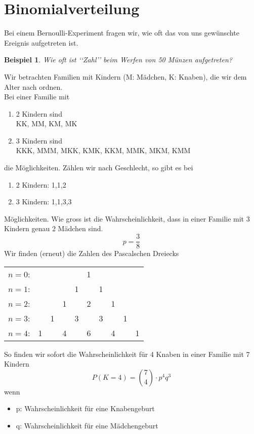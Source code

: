 \documentclass{report}
\newtheorem{myexample}{Beispiel}
\begin{document}
\section{Binomialverteilung}
Bei einem Bernoulli-Experiment fragen wir, wie oft das von uns gewünschte Ereignis aufgetreten ist.
\begin{myexample}
Wie oft ist \lq\lq{}Zahl\rq\rq{} beim Werfen von 50 Münzen aufgetreten?
\end{myexample}
Wir betrachten Familien mit Kindern (M: Mädchen, K: Knaben), die wir dem Alter nach ordnen.\\
Bei einer Familie mit
\begin{enumerate}
\item
2 Kindern sind\\
KK, MM, KM, MK
\item
3 Kindern sind\\
KKK, MMM, MKK, KMK, KKM, MMK, MKM, KMM
\end{enumerate}
die Möglichkeiten. Zählen wir nach Geschlecht, so gibt es bei
\begin{enumerate}
\item
2 Kindern: 1,1,2
\item
3 Kindern: 1,1,3,3
\end{enumerate}
Möglichkeiten. Wie gross ist die Wahrscheinlichkeit, dass in einer Familie mit 3 Kindern genau 2 Mädchen sind.
\begin{equation}
p = \frac{3}{8}
\end{equation}
Wir finden (erneut) die Zahlen des Pascalschen Dreiecks
\begin{center}
\begin{tabular}{rccccccccc}
$n=0$: & & & & & 1 & & & & \\
$n=1$: & & & & 1 & & 1 & & & \\
$n=2$: & & & 1 & & 2 & & 1 & & \\
$n=3$: & & 1 & & 3 & & 3 & & 1 & \\
$n=4$: & 1 & & 4 & & 6 & & 4 & & 1%
\end{tabular}
\end{center}
So finden wir sofort die Wahrscheinlichkeit für 4 Knaben in einer Familie mit 7 Kindern
\begin{equation}
P(K=4) = \binom{7}{4} \cdot p^4q^3
\end{equation}
wenn
\begin{itemize}
\item p: Wahrscheinlichkeit für eine Knabengeburt
\item q: Wahrscheinlichkeit für eine Mädchengeburt
\end{itemize}
\end{document}
